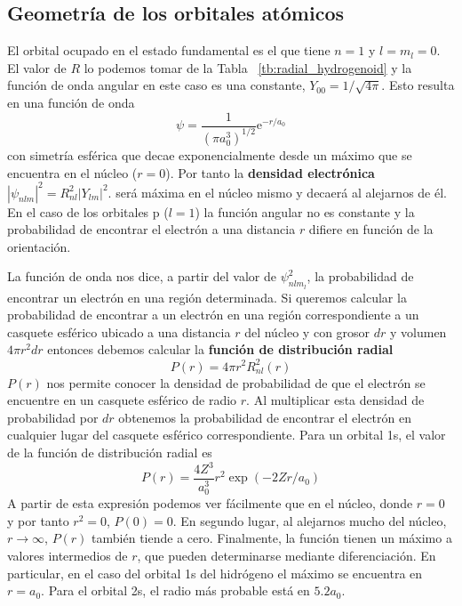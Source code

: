\subsection{Geometría de los orbitales atómicos}
El orbital ocupado en el estado fundamental es el que tiene $n=1$
y $l=m_l=0$. El valor de $R$ lo podemos tomar de la Tabla~
\ref{tb:radial_hydrogenoid} y la función de onda angular en 
este caso es una constante, $Y_{00}=1/\sqrt{4\pi}$.
Esto resulta en una función de onda 
\begin{equation}
    \psi=\frac{1}{(\pi a_0^3)^{1/2}}\mathrm{e}^{-r/a_0}
\end{equation}
con simetría esférica que decae exponencialmente desde un máximo
que se encuentra en el núcleo ($r=0$). Por tanto la \textbf{densidad 
electrónica} $|\psi_{nlm}|^2=R^2_{nl}|Y_{lm}|^2$. 
será máxima en el núcleo mismo y decaerá al alejarnos de él. 
En el caso de los orbitales p ($l=1$) la función angular no 
es constante y la probabilidad de encontrar el electrón a 
una distancia $r$ difiere en función de la orientación.

La función de onda nos dice, a partir del valor de $\psi_{nlm_l}^2$,
la probabilidad de encontrar un electrón en una región determinada.
Si queremos calcular la probabilidad de encontrar a un electrón
en una región correspondiente a un casquete esférico ubicado 
a una distancia $r$ del núcleo y con grosor $dr$ y volumen 
$4\pi r^2dr$ entonces debemos calcular la \textbf{función de distribución 
radial}
\begin{equation}
    P(r)=4\pi r^2R^2_{nl}(r)
\end{equation}
$P(r)$ nos permite conocer la densidad de probabilidad de que el electrón
se encuentre en un casquete esférico de radio $r$. Al multiplicar
esta densidad de probabilidad por $dr$ obtenemos la probabilidad de
encontrar el electrón en cualquier lugar del casquete esférico 
correspondiente. Para un orbital 1s, el valor de la función de
distribución radial es 
\begin{equation}
    P(r)=\frac{4Z^3}{a_0^3}r^2\exp{(-2Zr/a_0)}
\end{equation}
A partir de esta expresión podemos ver fácilmente que en el núcleo, donde
$r=0$ y por tanto $r^2=0$, $P(0)=0$. En segundo lugar, al alejarnos mucho
del núcleo, $r\xrightarrow{}\infty$, $P(r)$ también tiende a cero. Finalmente,
la función tienen un máximo a valores intermedios de $r$, que pueden determinarse
mediante diferenciación. En particular, en el caso del orbital 1s del
hidrógeno el máximo se encuentra en $r=a_0$. Para el orbital 2s, el radio
más probable está en $5.2a_0$. 

